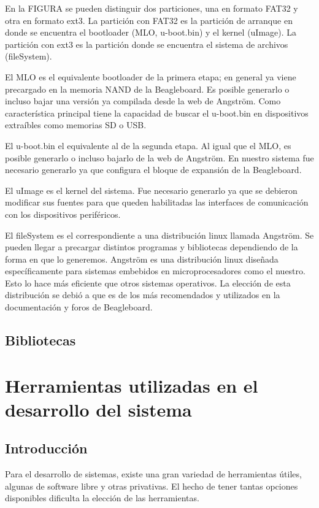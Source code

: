 En la FIGURA se pueden distinguir dos particiones, una en formato FAT32 y otra en formato ext3.
La partición con FAT32 es la partición de arranque en donde se encuentra el bootloader (MLO, u-boot.bin) y el kernel (uImage).
La partición con ext3 es la partición donde se encuentra el sistema de archivos (fileSystem).

El MLO es el equivalente bootloader de la primera etapa; en general ya viene precargado en la memoria NAND de la Beagleboard. Es posible generarlo o incluso bajar una versión ya compilada desde la web de Angström. Como característica principal tiene la capacidad de buscar el u-boot.bin en dispositivos extraíbles como memorias SD o USB.

El u-boot.bin el equivalente al de la segunda etapa. Al igual que el MLO, es posible generarlo o incluso bajarlo de la web de Angström. En nuestro sistema fue necesario generarlo ya que configura el bloque de expansión de la Beagleboard.

El uImage es el kernel del sistema. Fue necesario generarlo ya que se debieron modificar sus fuentes para que queden habilitadas las interfaces de comunicación con los dispositivos periféricos.

El fileSystem es el correspondiente a una distribución linux llamada Angström. Se pueden llegar a precargar distintos programas y bibliotecas dependiendo de la forma en que lo generemos.
Angström es una distribución linux diseñada específicamente para sistemas embebidos en microprocesadores como el nuestro. Esto lo hace más eficiente que otros sistemas operativos. La elección de esta distribución se debió a que es de los más recomendados y utilizados en la documentación y foros de Beagleboard.


\subsection{Bibliotecas}


\section{Herramientas utilizadas en el desarrollo del sistema}

\subsection{Introducción}
Para el desarrollo de sistemas, existe una gran variedad de herramientas útiles, algunas de software libre y otras privativas. El hecho de tener tantas opciones disponibles dificulta la elección de las herramientas. 

